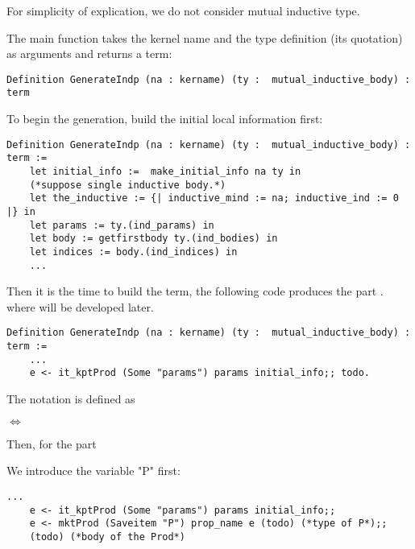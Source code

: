 \documentclass[a4paper,UKenglish,cleveref, autoref, thm-restate]{lipics-v2021}
\begin{document}
For simplicity of explication, we do not consider mutual inductive type.


The main function takes the kernel name and the type definition (its quotation) as arguments and returns a term:
\begin{lstlisting}[language = {Coq}, basicstyle = \small]
Definition GenerateIndp (na : kername) (ty :  mutual_inductive_body) : term 
\end{lstlisting}

To begin the generation, build the initial local information first:


\begin{lstlisting}[language = {Coq}, basicstyle = \small]
Definition GenerateIndp (na : kername) (ty :  mutual_inductive_body) : term :=
    let initial_info :=  make_initial_info na ty in
    (*suppose single inductive body.*)
    let the_inductive := {| inductive_mind := na; inductive_ind := 0 |} in
    let params := ty.(ind_params) in
    let body := getfirstbody ty.(ind_bodies) in
    let indices := body.(ind_indices) in
    ...
\end{lstlisting}

Then it is the time to build the  term, the following code produces the part . where  will be developed later.



\begin{lstlisting}[language = {Coq}, basicstyle = \small]
Definition GenerateIndp (na : kername) (ty :  mutual_inductive_body) : term :=
    ...
    e <- it_kptProd (Some "params") params initial_info;; todo.
\end{lstlisting}

\begin{remark}
The notation  is defined as

 $\Leftrightarrow$ 
\end{remark}


Then, for the part 

We introduce the variable "P" first:

\begin{lstlisting}[language = {Coq}, basicstyle = \small]
    ...
    e <- it_kptProd (Some "params") params initial_info;;
    e <- mktProd (Saveitem "P") prop_name e (todo) (*type of P*);;
    (todo) (*body of the Prod*)
\end{lstlisting}
\end{document}
